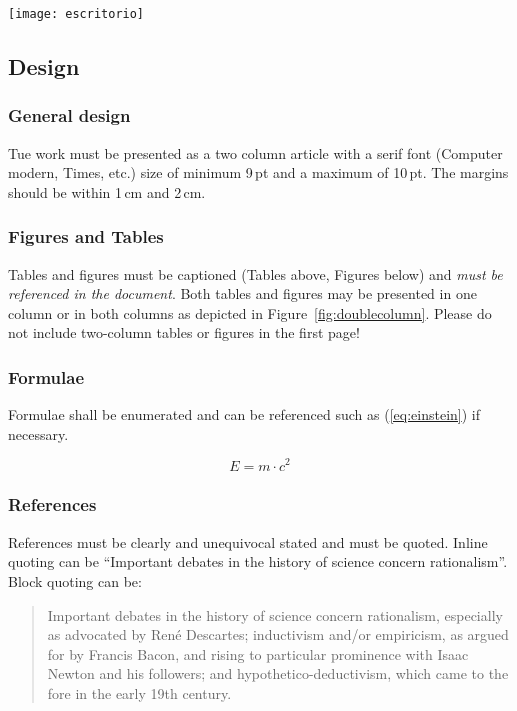 	\begin{figure*}[hbt]
		\texttt{[image: escritorio]}
		\caption{Prof. Notholt's home office set up as a double column.}\label{fig:doublecolumn}
	\end{figure*}
	
	\subsection{Design}
	
	\subsubsection{General design}
	
	Tue work must be presented as a two column article with a serif font (Computer modern, Times, etc.)  size of minimum 9\,pt and a maximum of 10\,pt. The margins should be within 1\,cm and 2\,cm.
	
	\subsubsection{Figures and Tables}
	Tables and figures must be captioned (Tables above, Figures below) and \emph{must be referenced in the document}. Both tables and figures may be presented in one column or in both columns as depicted in Figure~\ref{fig:doublecolumn}. Please do not include two-column tables or figures in the first page!
	

	
	\subsubsection{Formulae}
	Formulae shall be enumerated and can be referenced such as (\ref{eq:einstein}) if necessary.
	
	\begin{equation}
		E=m\cdot c^2 \label{eq:einstein}
	\end{equation}
	
	\subsubsection{References}
	References must be clearly and unequivocal stated and must be quoted. Inline quoting can be ``Important debates in the history of science concern rationalism''\cite{scientificMethod}. Block quoting can be:
	\begin{quotation}
		Important debates in the history of science concern rationalism, especially as advocated by René Descartes; inductivism and/or empiricism, as argued for by Francis Bacon, and rising to particular prominence with Isaac Newton and his followers; and hypothetico-deductivism, which came to the fore in the early 19th century.\cite{scientificMethod}
	\end{quotation}
	
